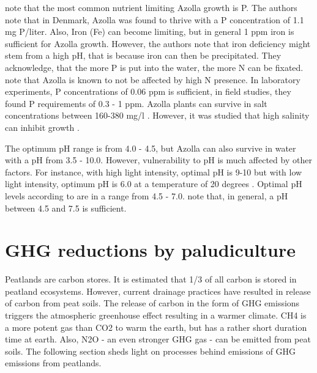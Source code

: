{\citet{lumpkin1980azolla} note that the most common nutrient limiting Azolla growth is P. The authors note that in Denmark, Azolla was found to thrive with a P concentration of 1.1 mg P/liter. Also, Iron (Fe) can become limiting, but in general 1 ppm iron is  sufficient for Azolla growth. However, the authors note that iron deficiency might stem from a high pH, that is because iron can then be precipitated. They acknowledge, that the more P is put into the water, the more N can be fixated. \citet{sabetraftar2013review} note that Azolla is known to not be affected by high N presence. In laboratory experiments, P concentrations of 0.06 ppm is sufficient, in field studies, they found P requirements of 0.3 - 1 ppm. Azolla plants can survive in salt concentrations between 160-380 mg/l  \citep{lumpkin1980azolla}. However, it was studied that high salinity can inhibit growth \citep{sabetraftar2013review, lumpkin1980azolla}. 

The optimum pH range is from 4.0 - 4.5, but Azolla can also survive in water with a pH from 3.5 - 10.0. However, vulnerability to pH is much affected by other factors. For instance, with high light intensity, optimal pH is 9-10 but with low light intensity, optimum pH is 6.0 at a temperature of 20 degrees \citep{wagner1997azolla}. Optimal pH levels according to \citet{lumpkin1980azolla} are in a range from 4.5 - 7.0. \citet{sabetraftar2013review} note that, in general, a pH between 4.5 and 7.5 is sufficient.


\chapter{GHG reductions by paludiculture}
Peatlands are carbon stores. It is estimated that 1/3 of all carbon is stored in peatland ecosystems. However, current drainage practices have resulted in release of carbon from peat soils. The release of carbon in the form of GHG emissions triggers the atmospheric greenhouse effect resulting in a warmer climate. CH4 is a more potent gas than CO2 to warm the earth, but has a rather short duration time at earth. Also, N2O - an even stronger GHG gas - can be emitted from peat soils. The following section sheds light on processes behind emissions of GHG emissions from peatlands.

}
